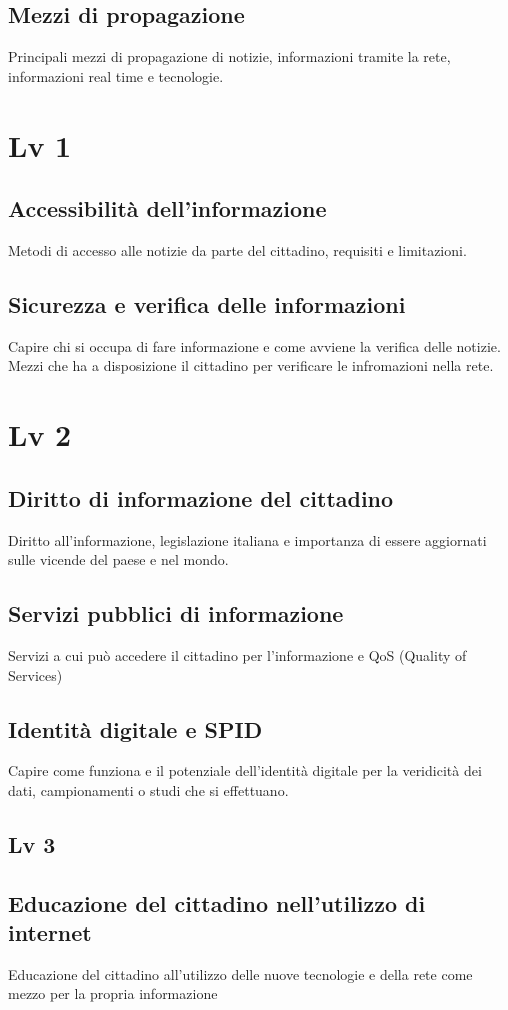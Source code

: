 \documentclass{article}
\begin{document}
\subsection{Mezzi di propagazione}
Principali mezzi di propagazione di notizie, informazioni tramite la rete, informazioni real time e tecnologie.
\section{Lv 1}
\subsection{Accessibilità dell'informazione}
Metodi di accesso alle notizie da parte del cittadino, requisiti e limitazioni.
\subsection{Sicurezza e verifica delle informazioni}
Capire chi si occupa di fare informazione e come avviene la verifica delle notizie.
Mezzi che ha a disposizione il cittadino per verificare le infromazioni nella rete.
\section{Lv 2}
\subsection{Diritto di informazione del cittadino}
Diritto all'informazione, legislazione italiana e importanza di essere aggiornati sulle vicende del paese e nel mondo.
\subsection{Servizi pubblici di informazione}
Servizi a cui può accedere il cittadino per l'informazione e QoS (Quality of Services)
\subsection{Identità digitale e SPID}
Capire come funziona e il potenziale dell'identità digitale per la veridicità dei dati, campionamenti o studi che si effettuano.
\subsection{Lv 3}
\subsection{Educazione del cittadino nell'utilizzo di internet}
Educazione del cittadino all'utilizzo delle nuove tecnologie e della rete come mezzo per la propria informazione
\end{document}
